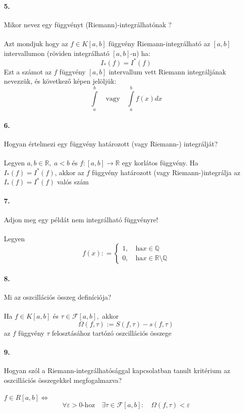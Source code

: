 \documentclass[10pt,a4paper]{article}
\newcommand{\R}{\mathbb{R}}
\renewcommand{\>}{\rightarrow}
\renewcommand{\r}{\tau}
\newcommand{\F}{\mathcal{F}}
\begin{document}
\paragraph{5. }
Mikor nevez egy függvényt (Riemann)-integrálhatónak ? \\\\
Azt mondjuk hogy az $f\in K[a,b]$ függvény Riemann-integrálható az $[a,b]$ intervallumon (röviden integrálható $[a,b]$-n) ha:
\[
I_*(f)=I^*(f)
\]
Ezt a számot az $f$ függvény $[a,b]$ intervallum vett Riemann integráljának nevezzük, és következő képen jelöljük:
\[
\int\limits_a^b \quad \text{vagy} \quad \int\limits_a^b f(x) dx  
\]
\paragraph{6. } Hogyan értelmezi egy függvény határozott (vagy Riemann-) integrálját? \\\\
Legyen $a,b \in \R , \; a<b$ és $f:[a,b] \> \R$ egy korlátos függvény. Ha $I_*(f)=I^*(f)$, akkor az $f$ függvény határozott (vagy Riemann-)integrálja az $I_*(f)=I^*(f)$ valós szám
\paragraph{7. } Adjon meg egy példát nem integrálható függvényre! \\\\ Legyen 
\[
f(x) : = \begin{cases}
1, \quad \text{ha} x \in \mathbb{Q} \\
0, \quad \text{ha} x \in \R \setminus \mathbb{Q}
\end{cases}
\]
\paragraph{8. } Mi az oszcillációs összeg definíciója? \\\\
Ha $f\in K[a,b]$ és $\r \in \F[a,b],$ akkor 
\[
\Omega (f,\r ) :=S(f,\r)-s(f,\r)
\]
az $f$ függvény $\r$ felosztásához tartózó oszcillációs összege
\paragraph{9. } Hogyan szól a Riemann-integrálhatósággal kapcsolatban tanult kritérium az oszcillációs összegekkel megfogalmazva? \\\\
$f\in R[a,b] \Longleftrightarrow$
\[
\forall \varepsilon > 0\text{-hoz} \quad \exists \r \in \mathcal{F}[a,b] : \quad \Omega (f,\r) < \varepsilon
\]
\newpage
\end{document}
